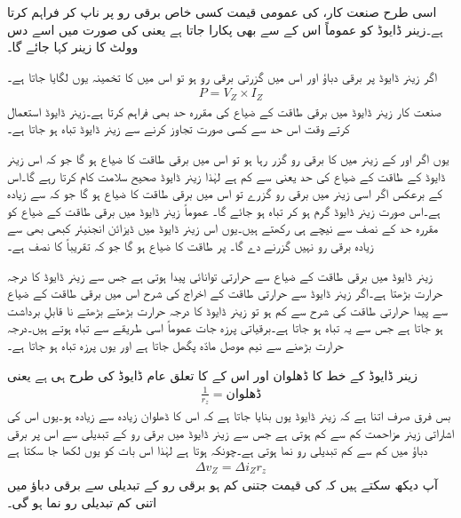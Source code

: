 اسی طرح صنعت کار،   کی عمومی قیمت کسی خاص برقی رو  پر ناپ کر فراہم کرتا ہے۔زینر ڈایوڈ کو عموماً اس کے  سے بھی پکارا جاتا ہے یعنی  کی صورت میں اسے دس وولٹ کا زینر کہا جائے گا۔

اگر زینر ڈایوڈ پر برقی دباؤ  اور اس میں گزرتی برقی رو  ہو تو اس میں    کا تخمینہ یوں لگایا جاتا ہے۔
\begin{align}
P=V_Z \times I_Z
\end{align}
صنعت کار زینر ڈایوڈ میں برقی طاقت کے ضیاع کی مقررہ حد بھی فراہم کرتا ہے۔زینر ڈایوڈ استعمال کرتے وقت اس حد سے کسی صورت تجاوز کرنے سے زینر ڈایوڈ تباہ ہو جاتا ہے۔

یوں اگر  اور  کے زینر میں   کا برقی رو گزر رہا ہو تو اس میں برقی طاقت کا ضیاع  ہو گا جو کہ اس زینر ڈایوڈ کے طاقت کے ضیاع کی حد یعنی  سے کم ہے لہٰذا زینر ڈایوڈ صحیح سلامت کام کرتا رہے گا۔اس کے برعکس اگر اسی زینر میں  برقی رو گزرے تو اس میں برقی طاقت کا ضیاع  ہو گا جو کہ  سے زیادہ ہے۔اس صورت زینر ڈایوڈ گرم ہو کر تباہ ہو جائے گا۔  عموماً زینر ڈایوڈ میں برقی طاقت کے ضیاع کو مقررہ حد کے نصف سے نیچے ہی رکھتے ہیں۔یوں اس زینر ڈایوڈ میں ڈیزائن انجنیئر کبھی بھی   سے زیادہ برقی رو نہیں گزرنے دے گا۔  پر طاقت کا ضیاع  ہو گا جو کہ تقریباً   کا نصف ہے۔

زینر ڈایوڈ میں برقی طاقت کے ضیاع سے حرارتی توانائی پیدا ہوتی ہے جس سے زینر ڈایوڈ کا درجہ حرارت بڑھتا ہے۔اگر زینر ڈایوڈ سے حرارتی طاقت کے اخراج کی شرح اس میں برقی طاقت کے ضیاع سے پیدا حرارتی طاقت کی شرح سے کم ہو تو زینر ڈایوڈ کا درجہ حرارت بڑھتے بڑھتے نا قابلِ برداشت ہو جاتا ہے جس سے یہ تباہ ہو جاتا ہے۔برقیاتی پرزہ جات عموماً اسی طریقے سے تباہ ہوتے ہیں۔درجہ حرارت بڑھنے سے نیم موصل مادّہ پگھل جاتا ہے اور یوں پرزہ تباہ ہو جاتا ہے۔ 

زینر ڈایوڈ کے خط کا ڈھلوان اور اس کے    کا تعلق عام ڈایوڈ کی طرح ہی ہے یعنی
\begin{align}
\frac{1}{r_z}=\text{ڈھلوان}
\end{align}
بس فرق صرف اتنا ہے کہ زینر ڈایوڈ یوں بنایا جاتا ہے کہ اس کا ڈھلوان زیادہ سے زیادہ ہو۔یوں اس کی اشاراتی زینر مزاحمت کم سے کم ہوتی ہے جس سے زینر ڈایوڈ میں برقی رو کے تبدیلی سے اس پر برقی دباؤ میں کم سے کم تبدیلی رو نما ہوتی ہے۔چونکہ   ہوتا ہے لہٰذا اس بات کو یوں لکھا جا سکتا ہے
\begin{align}
\Delta v_Z = \Delta i_Z r_z
\end{align}
آپ دیکھ سکتے ہیں کہ   کی قیمت جتنی کم ہو برقی رو کے تبدیلی سے برقی دباؤ میں اتنی کم تبدیلی رو نما ہو گی۔

